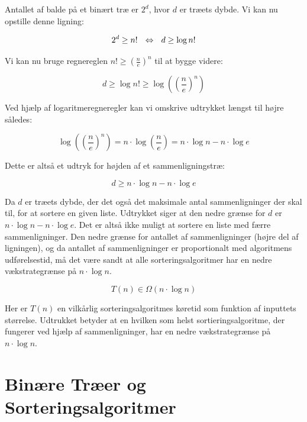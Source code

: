Antallet af balde på et binært træ er $2^d$, hvor $d$ er træets dybde. Vi kan nu opstille denne ligning:


$$2^d \geq n! \:\:\:\Leftrightarrow\:\:\: d \geq \log n!$$

Vi kan nu bruge regnereglen $n! \geq \left( \frac{n}{e} \right)^n$ til at bygge videre:

$$d \geq \log n! \geq \log \left(\left(\frac{n}{e}\right)^n\right)$$

Ved hjælp af logaritmeregneregler kan vi omskrive udtrykket længst til højre således:

$$\log \left(\left(\frac{n}{e}\right)^n\right) = n \cdot \log \left(\frac{n}{e} \right) = n \cdot \log n - n \cdot \log e$$

Dette er altså et udtryk for højden af et sammenligningstræ:

$$d \geq n \cdot \log n - n \cdot \log e$$

Da $d$ er træets dybde, der det også det maksimale antal sammenligninger der skal til, for at sortere en given liste. Udtrykket siger at den nedre grænse for $d$ er $n \cdot \log n - n \cdot \log e$. Det er altså ikke muligt at sortere en liste med færre sammenligninger. Den nedre grænse for antallet af sammenligninger (højre del af ligningen), og da antallet af sammenligninger er proportionalt med algoritmens udførelsestid, må det være sandt at alle sorteringsalgoritmer har en nedre vækstrategrænse på $n \cdot \log n$.

$$T(n) \in \Omega (n \cdot \log n)$$

Her er $T(n)$ en vilkårlig sorteringsalgoritmes køretid som funktion af inputtets størrelse. Udtrukket betyder at en hvilken som helst sortieringsalgoritme, der fungerer ved hjælp af sammenligninger, har en nedre vækstrategrænse på $n \cdot \log n$.









\section{Binære Træer og Sorteringsalgoritmer}
\label{sec:Binære Træer og Sorteringsalgoritmer}

